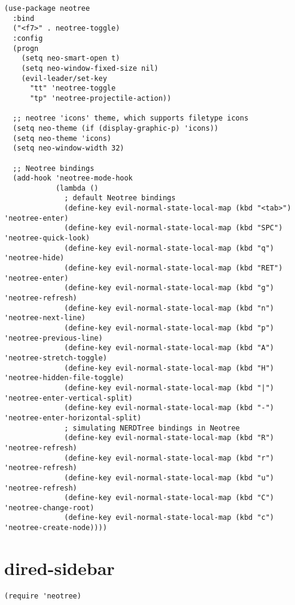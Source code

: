 \documentclass[11pt]{article}
\begin{document}
\begin{verbatim}
(use-package neotree
  :bind
  ("<f7>" . neotree-toggle)
  :config
  (progn
    (setq neo-smart-open t)
    (setq neo-window-fixed-size nil)
    (evil-leader/set-key
      "tt" 'neotree-toggle
      "tp" 'neotree-projectile-action))

  ;; neotree 'icons' theme, which supports filetype icons
  (setq neo-theme (if (display-graphic-p) 'icons))
  (setq neo-theme 'icons)
  (setq neo-window-width 32)

  ;; Neotree bindings
  (add-hook 'neotree-mode-hook
            (lambda ()
              ; default Neotree bindings
              (define-key evil-normal-state-local-map (kbd "<tab>") 'neotree-enter)
              (define-key evil-normal-state-local-map (kbd "SPC") 'neotree-quick-look)
              (define-key evil-normal-state-local-map (kbd "q") 'neotree-hide)
              (define-key evil-normal-state-local-map (kbd "RET") 'neotree-enter)
              (define-key evil-normal-state-local-map (kbd "g") 'neotree-refresh)
              (define-key evil-normal-state-local-map (kbd "n") 'neotree-next-line)
              (define-key evil-normal-state-local-map (kbd "p") 'neotree-previous-line)
              (define-key evil-normal-state-local-map (kbd "A") 'neotree-stretch-toggle)
              (define-key evil-normal-state-local-map (kbd "H") 'neotree-hidden-file-toggle)
              (define-key evil-normal-state-local-map (kbd "|") 'neotree-enter-vertical-split)
              (define-key evil-normal-state-local-map (kbd "-") 'neotree-enter-horizontal-split)
              ; simulating NERDTree bindings in Neotree
              (define-key evil-normal-state-local-map (kbd "R") 'neotree-refresh)
              (define-key evil-normal-state-local-map (kbd "r") 'neotree-refresh)
              (define-key evil-normal-state-local-map (kbd "u") 'neotree-refresh)
              (define-key evil-normal-state-local-map (kbd "C") 'neotree-change-root)
              (define-key evil-normal-state-local-map (kbd "c") 'neotree-create-node))))
\end{verbatim}

\section*{dired-sidebar}
\label{sec:orgd67524f}

\begin{verbatim}
(require 'neotree)
\end{verbatim}
\end{document}
